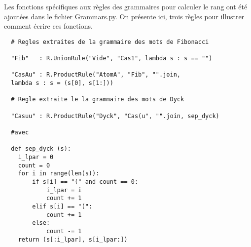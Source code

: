 \documentclass[a4paper, titlepage]{article}
\begin{document}
Les fonctions spécifiques aux règles des grammaires pour calculer le
rang ont été ajoutées dans le fichier Grammars.py. On présente ici,
trois règles pour illustrer comment écrire ces fonctions.\\
\pagebreak
{} 
\begin{lstlisting}
  # Regles extraites de la grammaire des mots de Fibonacci

  "Fib"   : R.UnionRule("Vide", "Cas1", lambda s : s == "")

  "CasAu" : R.ProductRule("AtomA", "Fib", "".join,
  lambda s : s = (s[0], s[1:]))

  # Regle extraite le la grammaire des mots de Dyck

  "Casuu" : R.ProductRule("Dyck", "Cas(u", "".join, sep_dyck)

  #avec

  def sep_dyck (s):
    i_lpar = 0
    count = 0
    for i in range(len(s)):
        if s[i] == "(" and count == 0:
            i_lpar = i
            count += 1
        elif s[i] == "(":
            count += 1
        else:
            count -= 1
    return (s[:i_lpar], s[i_lpar:])

\end{lstlisting}
\vspace{1cm}
\end{document}
